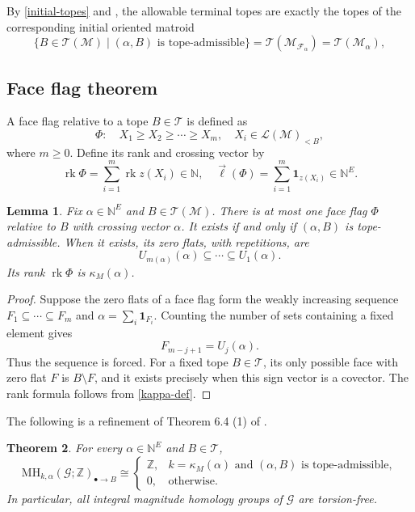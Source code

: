 \documentclass[10pt]{amsart}
\theoremstyle{plain}
\newtheorem{theorem}{Theorem}[section]
\newtheorem{lemma}[theorem]{Lemma}
\theoremstyle{definition}
\newcommand{\one}{\mathbf{1}}
\newcommand{\NN}{\mathbb{N}}
\newcommand{\ZZ}{\mathbb{Z}}
\newcommand{\T}{\mathcal{T}}
\newcommand{\F}{\mathcal{F}}
\newcommand{\G}{\mathcal{G}}
\newcommand{\MH}{\mathrm{MH}}
\newcommand{\M}{\mathcal{M}}
\newcommand{\Lcov}{\mathcal{L}}
\newcommand{\rk}{\operatorname{rk}}
\begin{document}
By \eqref{initial-topes} and , the allowable terminal topes are exactly the topes of the corresponding initial oriented matroid
\begin{equation}\label{eq:admissible-initial-topes}
\{B\in\T(\M)\mid(\alpha,B)\text{ is tope-admissible}\}=\T(\M_{\F_\alpha})=\T(\M_\alpha),
\end{equation}



\subsection{Face flag theorem}
A face flag relative to a tope $B\in\T$ is defined as
\[
\Phi:\quad X_1\geq X_2\geq\cdots\geq X_m, \quad X_i\in\Lcov(\M)_{<B},
\]
where $m\geq 0$. Define its rank and crossing vector by
\[
\rk\Phi=\sum_{i=1}^m\rk z(X_i)\in\NN,\quad \vec{\ell}(\Phi)=\sum_{i=1}^m\one_{z(X_i)}\in\NN^E.
\]

\begin{lemma}\label{unique-flag}
Fix $\alpha\in\NN^E$ and $B\in\T(\M)$. There is at most one face flag $\Phi$ relative to $B$ with crossing vector $\alpha$. It exists if and only if $(\alpha,B)$ is tope-admissible. When it exists, its zero flats, with repetitions, are
\[
U_{m(\alpha)}(\alpha)\subseteq\cdots\subseteq U_1(\alpha).
\]
Its rank $\rk\Phi$ is $\kappa_M(\alpha)$.
\end{lemma}

\begin{proof}
Suppose the zero flats of a face flag form the weakly increasing sequence $F_1\subseteq\cdots\subseteq F_m$ and $\alpha=\sum_i\one_{F_i}$. Counting the number of sets containing a fixed element gives
\[
F_{m-j+1}=U_j(\alpha).
\]
Thus the sequence is forced. For a fixed tope $B\in\T$, its only possible face with zero flat $F$ is $B\setminus F$, and it exists precisely when this sign vector is a covector. The rank formula follows from \eqref{kappa-def}.
\end{proof}

The following is a refinement of Theorem 6.4 (1) of \cite{Koizumi2026a}.
\begin{theorem}\label{Koizumi-basis}
For every $\alpha\in\NN^E$ and $B\in\T$,
\[
\MH_{k,\alpha}(\G;\ZZ)_{\bullet\to B}\cong\begin{cases}
 \ZZ,&k=\kappa_M(\alpha)\text{ and }(\alpha,B)\text{ is tope-admissible},\\
 0,&\text{otherwise}.
 \end{cases}
\]
In particular, all integral magnitude homology groups of $\G$ are torsion-free.
\end{theorem}
\end{document}
